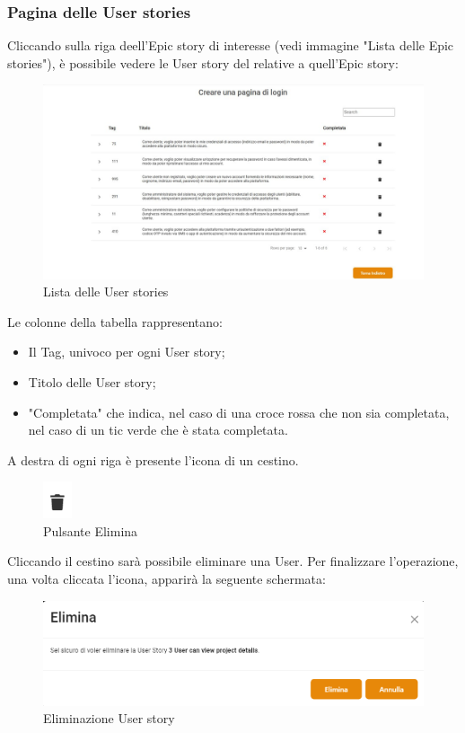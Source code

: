 \documentclass{article}
\begin{document}
\subsubsection{Pagina delle User stories}
Cliccando sulla riga deell'Epic story di interesse (vedi immagine "Lista delle Epic stories"), è possibile vedere le User story del relative a quell'Epic story:
    \begin{figure}[H]
      \centering
      \includegraphics[width=\textwidth]{documenti/Screenshot manuale utente/us pm dev.jpeg}
      \caption{Lista delle User stories}
      \label{lista user}
    \end{figure}
Le colonne della tabella rappresentano: 
\begin{itemize}
    \item Il Tag, univoco per ogni User story;
    \item Titolo delle User story;
    \item "Completata" che indica, nel caso di una croce rossa che non sia completata, nel caso di un tic verde che è stata completata.
\end{itemize}
A destra di ogni riga è presente l'icona di un cestino.
    \begin{figure}[H]
      \centering
      \includegraphics{documenti/Screenshot manuale utente/cestino.png}
      \caption{Pulsante Elimina}
      \label{delete}
    \end{figure} 
    Cliccando il cestino sarà possibile eliminare una User. Per finalizzare l'operazione, una volta cliccata l'icona, apparirà la seguente schermata: 
        \begin{figure}[H]
      \centering
      \includegraphics[width=\textwidth]{documenti/Screenshot manuale utente/delete us.png}
      \caption{Eliminazione User story}
      \label{deleteuser}
    \end{figure} 
\end{document}
